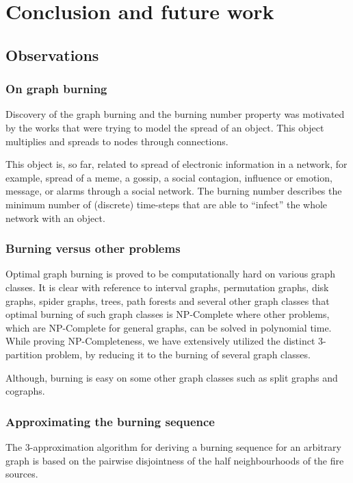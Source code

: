\chapter{Conclusion and future work}\label{chapter:conclusion}

\section{Observations}

\subsection{On graph burning}

Discovery of the graph burning and the burning number property was motivated by the works that were trying to model the spread of an object. This object multiplies and spreads to nodes through connections.

This object is, so far, related to spread of electronic information in a network, for example, spread of a meme, a gossip, a social contagion, influence or emotion, message, or alarms through a social network. The burning number describes the minimum number of (discrete) time-steps that are able to ``infect'' the whole network with an object.

\subsection{Burning versus other problems}

Optimal graph burning is proved to be computationally hard on various graph classes. It is clear with reference to interval graphs, permutation graphs, disk graphs, spider graphs, trees, path forests and several other graph classes that optimal burning of such graph classes is NP-Complete where other problems, which are NP-Complete for general graphs, can be solved in polynomial time. While proving NP-Completeness, we have extensively utilized the distinct 3-partition problem, by reducing it to the burning of several graph classes.

Although, burning is easy on some other graph classes such as split graphs and cographs.

\subsection{Approximating the burning sequence}

The 3-approximation algorithm for deriving a burning sequence for an arbitrary graph is based on the pairwise disjointness of the half neighbourhoods of the fire sources.


